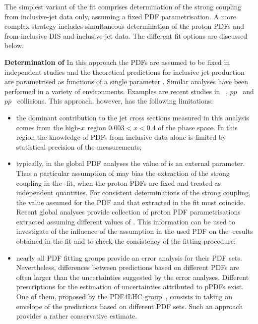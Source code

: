 The simplest variant of the fit comprises determination of the strong coupling \asz from inclusive-jet data only, assuming a fixed PDF parametrisation. A more complex strategy includes simultaneous determination of the proton PDFs and \asz from inclusive DIS and inclusive-jet data. The different fit options are discussed below.
 
{\flushleft \textbf{Determination of \asz}}\newline
In this approach the PDFs are assumed to be fixed in independent studies and the theoretical predictions for inclusive jet production are parametrised as functions of a single parameter \asz. Similar analyses have been performed in a variety of environments. Examples are recent studies in \ep~\cite{}, $pp$~\cite{} and $p\bar{p}$~\cite{} collisions. This approach, however, has the following limitations:
\begin{itemize}
 \item the dominant contribution to the jet cross sections measured in this analysis comes from the high-$\mbox{${x}$}$ region $0.003<x<0.4$ of the phase space. In this region the knowledge of PDFs from \hera inclusive data alone is limited by statistical precision of the measurements;
 \item typically, in the global PDF analyses the value of \asz is an external parameter. Thus a particular assumption of \asz may bias the extraction of the strong coupling in the \as-fit, when the proton PDFs are fixed and treated as independent quantities. For consistent determinations of the strong coupling, the value assumed for the PDF and that extracted in the fit must coincide. Recent global analyses provide collection of proton PDF parametrisations extracted assuming different values of \asz. This information can be used to investigate of the influence of the \asz assumption in the used PDF on the \as-results obtained in the fit and to check the consistency of the fitting procedure;
 \item nearly all PDF fitting groups provide an error analysis for their PDF sets. Nevertheless, differences between predictions based on different PDFs are often larger than the uncertainties suggested by the error analyses. Different prescriptions for the estimation of uncertainties attributed to pPDFs exist. One of them, proposed by the PDF4LHC group~\cite{pdf4lhc:2011}, consists in taking an envelope of the predictions based on different PDF sets. Such an approach provides a rather conservative estimate. 
\end{itemize}

